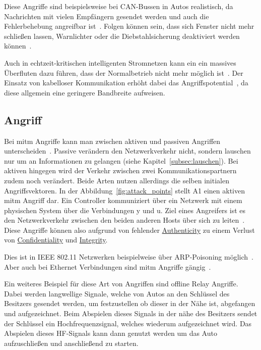 Diese Angriffe sind beispielsweise bei CAN-Bussen in Autos realistisch, da Nachrichten mit vielen Empfängern gesendet werden und auch die Fehlerbehebung angreifbar ist~\cite{HUM 81,26}.%
Folgen können sein, dass sich Fenster nicht mehr schließen lassen, Warnlichter oder die Diebstahlsicherung deaktiviert werden können~\cite{HUM 68}.

Auch in echtzeit-kritischen intelligenten Stromnetzen kann ein ein massives Überfluten dazu führen, dass der Normalbetrieb nicht mehr möglich ist~\cite{HUM 98}.
Der Einsatz von kabelloser Kommunikation erhöht dabei das Angriffspotential~\cite{HUM 99}, da diese allgemein eine geringere Bandbreite aufweisen.
\subsection{ Angriff}\label{subsec:mitm}
Bei \gls{mitm} Angriffe kann man zwischen aktiven und passiven Angriffen unterscheiden~\cite{WYX+10}.%
Passive verändern den Netzwerkverkehr nicht, sondern lauschen nur um an Informationen zu gelangen (siehe Kapitel~\ref{subsec:lauschen}).
Bei aktiven hingegen wird der Verkehr zwischen zwei Kommunikationspartnern zudem noch verändert.
Beide Arten nutzen allerdings die selben initialen Angriffsvektoren.
In der Abbildung~\ref{fig:attack_points} stellt A1 einen aktiven \gls{mitm} Angriff dar.
Ein Controller kommuniziert über ein Netzwerk mit einem physischen System über die Verbindungen y und u.
Ziel eines Angreifers ist es den Netzwerkverkehr zwischen den beiden anderen Hosts über sich zu leiten~\cite{WYX+10,FPA+18}.
Diese Angriffe können also aufgrund von fehlender \hyperref[def:authenticity]{Authenticity} zu einem Verlust von \hyperref[def:confidentiality]{Confidentiality} und \hyperref[def:integrity]{Integrity}.

Dies ist in IEEE 802.11 Netzwerken beispielweise über ARP-Poisoning möglich~\cite{FIT+2012}.
Aber auch bei Ethernet Verbindungen sind \gls{mitm} Angriffe gängig~\cite{HLL+17}.

Ein weiteres Beispiel für diese Art von Angriffen sind offline Relay Angriffe.
Dabei werden langwellige Signale, welche von Autos an den Schlüssel des Besitzers gesendet werden, um festzustellen ob dieser in der Nähe ist, abgefangen und aufgezeichnet.
Beim Abspielen dieses Signals in der nähe des Besitzers sendet der Schlüssel ein Hochfrequenzsignal, welches wiederum aufgezeichnet wird.
Das Abspielen dieses HF-Signals kann dann genutzt werden um das Auto aufzuschließen und anschließend zu starten.~\cite{HLL+17}

